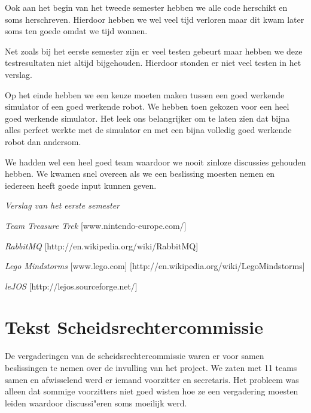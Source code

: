 \documentclass[eind]{penoverslag}
\begin{document}
Ook aan het begin van het tweede semester hebben we alle code herschikt en soms herschreven. Hierdoor hebben we wel veel tijd verloren maar dit kwam later soms ten goede omdat we tijd wonnen. 

Net zoals bij het eerste semester zijn er veel testen gebeurt maar hebben we deze testresultaten niet altijd bijgehouden. Hierdoor stonden er niet veel testen in het verslag.

Op het einde hebben we een keuze moeten maken tussen een goed werkende simulator of een goed werkende robot. We hebben toen gekozen voor een heel goed werkende simulator. Het leek ons belangrijker om te laten zien dat bijna alles perfect werkte met de simulator en met een bijna volledig goed werkende robot dan andersom. 

We hadden wel een heel goed team waardoor we nooit zinloze discussies gehouden hebben. We kwamen snel overeen als we een beslissing moesten nemen en iedereen heeft goede input kunnen geven. 

\begin{thebibliography}{9}

\textit{Verslag van het eerste semester}

\textit{Team Treasure Trek} \mbox{[www.nintendo-europe.com/]}

\textit{RabbitMQ} \mbox{[http://en.wikipedia.org/wiki/RabbitMQ]}

\textit{Lego Mindstorms} \mbox{[www.lego.com]} \mbox{[http://en.wikipedia.org/wiki/Lego\textendash Mindstorms]}

\textit{leJOS} \mbox{[http://lejos.sourceforge.net/]}

\end{thebibliography}

\section{Tekst Scheidsrechtercommissie}

De vergaderingen van de scheidsrechtercommissie waren er voor samen beslissingen te nemen over de invulling van het project. We zaten met 11 teams samen en afwisselend werd er iemand voorzitter en secretaris. Het probleem was alleen dat sommige voorzitters niet goed wisten hoe ze een vergadering moesten leiden waardoor discussi"eren soms moeilijk werd. \\
\end{document}
